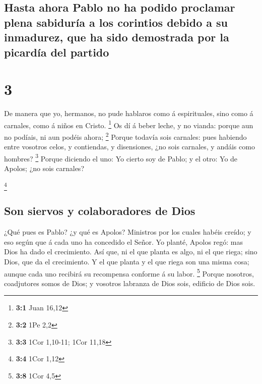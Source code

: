 \hypertarget{hasta-ahora-pablo-no-ha-podido-proclamar-plena-sabiduruxeda-a-los-corintios-debido-a-su-inmadurez-que-ha-sido-demostrada-por-la-picarduxeda-del-partido}{%
\subsection{Hasta ahora Pablo no ha podido proclamar plena sabiduría a
los corintios debido a su inmadurez, que ha sido demostrada por la
picardía del
partido}\label{hasta-ahora-pablo-no-ha-podido-proclamar-plena-sabiduruxeda-a-los-corintios-debido-a-su-inmadurez-que-ha-sido-demostrada-por-la-picarduxeda-del-partido}}

\hypertarget{section-2}{%
\section{3}\label{section-2}}

 De manera que yo, hermanos, no pude hablaros como á
espirituales, sino como á carnales, como á niños en Cristo. \footnote{\textbf{3:1}
  Juan 16,12}  Os dí á beber leche, y no vianda: porque
aun no podíais, ni aun podéis ahora; \footnote{\textbf{3:2} 1Pe 2,2}
 Porque todavía sois carnales: pues habiendo entre
vosotros celos, y contiendas, y disensiones, ¿no sois carnales, y andáis
como hombres? \footnote{\textbf{3:3} 1Cor 1,10-11; 1Cor 11,18}
 Porque diciendo el uno: Yo cierto soy de Pablo; y el
otro: Yo de Apolos; ¿no sois carnales?

\footnote{\textbf{3:4} 1Cor 1,12}

\hypertarget{son-siervos-y-colaboradores-de-dios}{%
\subsection{Son siervos y colaboradores de
Dios}\label{son-siervos-y-colaboradores-de-dios}}

 ¿Qué pues es Pablo? ¿y qué es Apolos? Ministros por los
cuales habéis creído; y eso según que á cada uno ha concedido el Señor.
 Yo planté, Apolos regó: mas Dios ha dado el crecimiento.
 Así que, ni el que planta es algo, ni el que riega; sino
Dios, que da el crecimiento.  Y el que planta y el que
riega son una misma cosa; aunque cada uno recibirá su recompensa
conforme á su labor. \footnote{\textbf{3:8} 1Cor 4,5} 
Porque nosotros, coadjutores somos de Dios; y vosotros labranza de Dios
sois, edificio de Dios sois.

